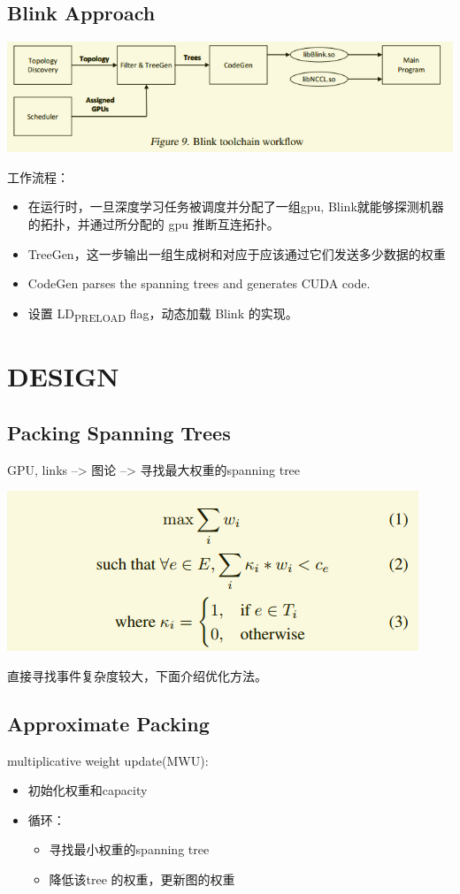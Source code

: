 \documentclass[11pt]{article}
\begin{document}
\subsection{Blink Approach}
\label{sec:org6f87fa1}
\begin{center}
\includegraphics[width=.9\linewidth]{Blink.org_imgs/20201111_200312_t4CsGg.png}
\end{center}
工作流程：
\begin{itemize}
\item 在运行时，一旦深度学习任务被调度并分配了一组gpu, Blink就能够探测机器的拓扑，并通过所分配的 gpu 推断互连拓扑。
\item TreeGen，这一步输出一组生成树和对应于应该通过它们发送多少数据的权重
\item CodeGen parses the spanning trees and generates CUDA code.
\item 设置 LD\textsubscript{PRELOAD} flag，动态加载 Blink 的实现。
\end{itemize}
\section{DESIGN}
\label{sec:org6c39e34}
\subsection{Packing Spanning Trees}
\label{sec:org7c9214f}
GPU, links --> 图论 --> 寻找最大权重的spanning tree
\begin{center}
\includegraphics[width=.9\linewidth]{Blink.org_imgs/20201111_201051_Bhhwwu.png}
\end{center}
直接寻找事件复杂度较大，下面介绍优化方法。
\subsection{Approximate Packing}
\label{sec:org61ae8a5}
multiplicative weight update(MWU):
\begin{itemize}
\item 初始化权重和capacity
\item 循环：
\begin{itemize}
\item 寻找最小权重的spanning tree
\item 降低该tree 的权重，更新图的权重
\end{itemize}
\end{itemize}
\end{document}
